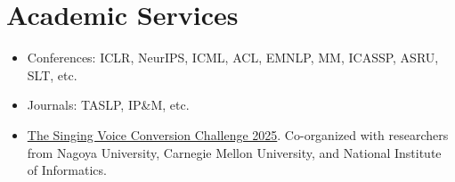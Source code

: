 \documentclass{resume}
\begin{document}
\section{Academic Services}
\begin{itemize}
  \item Conferences: ICLR, NeurIPS, ICML, ACL, EMNLP, MM, ICASSP, ASRU, SLT, etc.
  \item Journals: TASLP, IP\&M, etc.
\end{itemize}
\begin{itemize}
  \item \href{https://www.vc-challenge.org/}{The Singing Voice Conversion Challenge 2025}. Co-organized with researchers from Nagoya University, Carnegie Mellon University, and National Institute of Informatics.
\end{itemize}
\end{document}
